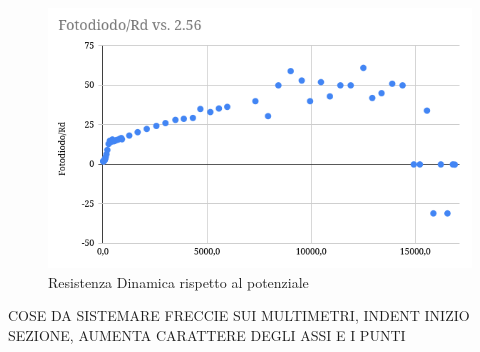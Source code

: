 \documentclass[a4paper]{article}
\begin{document}
\begin{figure}[!htbp]
      \includegraphics[width=\textwidth]{immagini/fotodiodord.png}
        \caption{Resistenza Dinamica rispetto al potenziale}
\end{figure}
\FloatBarrier



\newpage
\huge{COSE DA SISTEMARE}
FRECCIE SUI MULTIMETRI, INDENT INIZIO SEZIONE, AUMENTA CARATTERE DEGLI ASSI E I PUNTI
\end{document}
